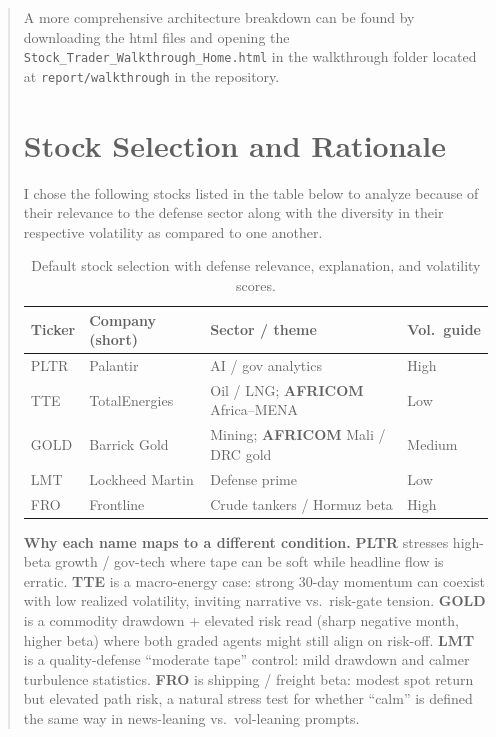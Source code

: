 \documentclass[11pt]{article}
\begin{document}
\begin{abstract}
\noindent A more comprehensive architecture breakdown can be found by downloading the html files and opening the \texttt{Stock\_Trader\_Walkthrough\_Home.html} in the walkthrough folder located at \texttt{report/walkthrough} in the repository. 

\section{Stock Selection and Rationale}

I chose the following stocks listed in the table below to analyze because of their relevance to the defense sector along with the diversity in their respective volatility as compared to one another.

\begin{table}[h]
  \centering
  \footnotesize
  \begin{tabular}{@{}llll@{}}
    \toprule
    Ticker & Company (short) & Sector / theme & Vol.\ guide \\
    \midrule
    PLTR & Palantir & AI / gov analytics & High \\
    TTE & TotalEnergies & Oil / LNG; \textbf{AFRICOM} Africa--MENA & Low \\
    GOLD & Barrick Gold & Mining; \textbf{AFRICOM} Mali / DRC gold & Medium \\
    LMT & Lockheed Martin & Defense prime & Low \\
    FRO & Frontline & Crude tankers / Hormuz beta & High \\
    \bottomrule
  \end{tabular}
  \caption{Default stock selection with defense relevance, explanation, and volatility scores.}
  \label{tab:stocks}
\end{table}

\noindent\textbf{Why each name maps to a different condition.} \textbf{PLTR} stresses high-beta growth / gov-tech where tape can be soft while headline flow is erratic. \textbf{TTE} is a macro-energy case: strong 30-day momentum can coexist with low realized volatility, inviting narrative vs.\ risk-gate tension. \textbf{GOLD} is a commodity drawdown + elevated risk read (sharp negative month, higher beta) where both graded agents might still align on risk-off. \textbf{LMT} is a quality-defense ``moderate tape'' control: mild drawdown and calmer turbulence statistics. \textbf{FRO} is shipping / freight beta: modest spot return but elevated path risk, a natural stress test for whether ``calm'' is defined the same way in news-leaning vs.\ vol-leaning prompts.


\end{abstract}
\end{document}
